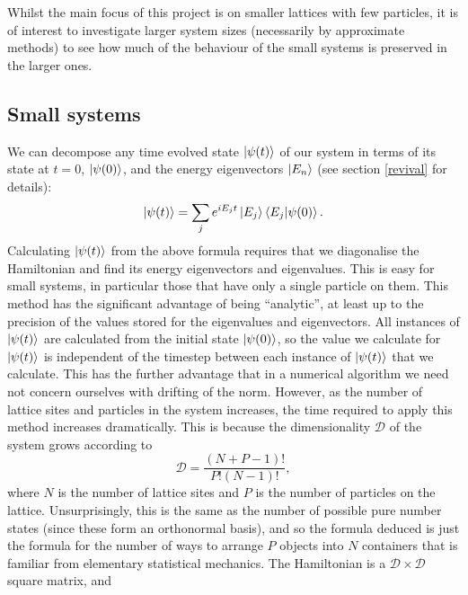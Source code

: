 \documentclass[a4paper,10pt]{article}
\theoremstyle{plain}
\begin{document}
Whilst the main focus of this project is on smaller lattices with few 
particles, it is of interest to investigate larger system sizes (necessarily 
by approximate methods) to see how much of the behaviour of the small systems 
is preserved in the larger ones.

\subsection{Small systems}

We can decompose any time evolved state $\ket{\psi(t)}$ of our system in terms 
of its state at $t=0$, $\ket{\psi(0)}$, and the energy eigenvectors $\ket{E_n}$ 
(see section \ref{revival} for details):
\begin{equation}
  \ket{\psi(t)}=\sum_je^{iE_{j}t}\ket{E_j}\braket{E_j|\psi(0)}.
\end{equation}
Calculating $\ket{\psi(t)}$ from the above formula requires that we diagonalise
the Hamiltonian and find its energy eigenvectors and eigenvalues. This is easy
for small systems, in particular those that have only a single particle on them.
This method has the significant advantage of being ``analytic'', at least up to
the precision of the values stored for the eigenvalues and eigenvectors. All
instances of $\ket{\psi(t)}$ are calculated from the initial state
$\ket{\psi(0)}$, so the value we calculate for $\ket{\psi(t)}$ is independent of the timestep
between each instance of $\ket{\psi(t)}$ that we calculate. This has the further
advantage that in a numerical algorithm we need not concern ourselves with
drifting of the norm. However, as the number of lattice
sites and particles in the system increases, the time required to apply this
method increases dramatically. This is because the dimensionality $\mathcal{D}$
of the system grows according to
\begin{equation}
 \mathcal{D}=\frac{\left(N+P-1\right)!}{P!\left(N-1\right)!},
 \label{time_evolution}
\end{equation}
where $N$ is the number of lattice sites and $P$ is the number of particles on 
the lattice. Unsurprisingly, this is the same as the number of possible pure 
number states (since these form an orthonormal basis), and so the formula 
deduced is just the formula for the number of ways to arrange $P$ objects into 
$N$ containers that is familiar from elementary statistical mechanics.
The Hamiltonian is a $\mathcal{D}\times\mathcal{D}$ square matrix, and 
\end{document}
